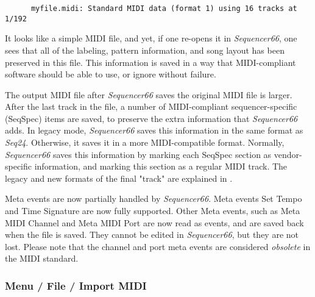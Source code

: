    \begin{verbatim}
      myfile.midi: Standard MIDI data (format 1) using 16 tracks at 1/192
   \end{verbatim}

   It looks like a simple MIDI file, and yet, if one re-opens it in
   \textsl{Sequencer66}, one sees that all of the labeling, pattern
   information, and song layout has been preserved in this file.
   This information is saved in a way that MIDI-compliant software
   should be able to use, or ignore without failure.

   The output MIDI file after \textsl{Sequencer66} saves the original MIDI file
   is larger.
   After the last track in the file, a number of
   MIDI-compliant sequencer-specific (SeqSpec) items are saved, to preserve
   the extra information that \textsl{Sequencer66} adds.
   In legacy mode, \textsl{Sequencer66} saves this information
   in the same format as \textsl{Seq24}.
   Otherwise, it saves it in a more MIDI-compatible format.
   Normally, \textsl{Sequencer66} saves this information by marking
   each SeqSpec section as vendor-specific information, and marking this
   section as a regular MIDI track.
   The legacy and new formats of the final "track" are explained in
   .

   Meta events are now partially handled by \textsl{Sequencer66}.
   Meta events Set Tempo
   and Time Signature
   are now fully supported.
   Other Meta events,
   such as Meta MIDI Channel
   and Meta MIDI Port
   are now read as events, and are saved back when the file is saved.
   They cannot be edited in \textsl{Sequencer66}, but they are
   not lost.
   Please note that the channel and port meta events are
   considered \textsl{obsolete} in the MIDI standard.

\subsubsection{Menu / File / Import MIDI}
\label{subsubsec:seq66_menu_file_import}

